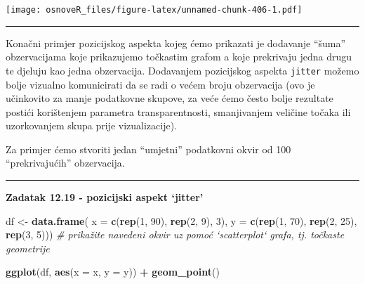 \documentclass[]{book}
\newenvironment{Shaded}{\begin{snugshade}}{\end{snugshade}}
\newcommand{\KeywordTok}[1]{\textcolor[rgb]{0.13,0.29,0.53}{\textbf{#1}}}
\newcommand{\DataTypeTok}[1]{\textcolor[rgb]{0.13,0.29,0.53}{#1}}
\newcommand{\DecValTok}[1]{\textcolor[rgb]{0.00,0.00,0.81}{#1}}
\newcommand{\StringTok}[1]{\textcolor[rgb]{0.31,0.60,0.02}{#1}}
\newcommand{\CommentTok}[1]{\textcolor[rgb]{0.56,0.35,0.01}{\textit{#1}}}
\newcommand{\OperatorTok}[1]{\textcolor[rgb]{0.81,0.36,0.00}{\textbf{#1}}}
\newcommand{\NormalTok}[1]{#1}
\theoremstyle{definition}
\theoremstyle{definition}
\theoremstyle{definition}
\theoremstyle{remark}
\begin{document}
\texttt{[image: osnoveR\_files/figure-latex/unnamed-chunk-406-1.pdf]}

\begin{center}\rule{0.5\linewidth}{\linethickness}\end{center}

Konačni primjer pozicijskog aspekta kojeg ćemo prikazati je dodavanje
``šuma'' obzervacijama koje prikazujemo točkastim grafom a koje
prekrivaju jedna drugu te djeluju kao jedna obzervacija. Dodavanjem
pozicijskog aspekta \texttt{jitter} možemo bolje vizualno komunicirati
da se radi o većem broju obzervacija (ovo je učinkovito za manje
podatkovne skupove, za veće ćemo često bolje rezultate postići
korištenjem parametra transparentnosti, smanjivanjem veličine točaka ili
uzorkovanjem skupa prije vizualizacije).

Za primjer ćemo stvoriti jedan ``umjetni'' podatkovni okvir od 100
``prekrivajućih'' obzervacija.

\begin{center}\rule{0.5\linewidth}{\linethickness}\end{center}

\textbf{Zadatak 12.19 - pozicijski aspekt `jitter'}

\begin{Shaded}
\begin{Highlighting}[]
\NormalTok{df <-}\StringTok{ }\KeywordTok{data.frame}\NormalTok{( }\DataTypeTok{x =} \KeywordTok{c}\NormalTok{(}\KeywordTok{rep}\NormalTok{(}\DecValTok{1}\NormalTok{, }\DecValTok{90}\NormalTok{), }\KeywordTok{rep}\NormalTok{(}\DecValTok{2}\NormalTok{, }\DecValTok{9}\NormalTok{), }\DecValTok{3}\NormalTok{),}
                  \DataTypeTok{y =} \KeywordTok{c}\NormalTok{(}\KeywordTok{rep}\NormalTok{(}\DecValTok{1}\NormalTok{, }\DecValTok{70}\NormalTok{), }\KeywordTok{rep}\NormalTok{(}\DecValTok{2}\NormalTok{, }\DecValTok{25}\NormalTok{), }\KeywordTok{rep}\NormalTok{(}\DecValTok{3}\NormalTok{, }\DecValTok{5}\NormalTok{)))}
\CommentTok{# prikažite navedeni okvir uz pomoć `scatterplot` grafa, tj. točkaste geometrije}
\end{Highlighting}
\end{Shaded}

\begin{Shaded}
\begin{Highlighting}[]
\KeywordTok{ggplot}\NormalTok{(df, }\KeywordTok{aes}\NormalTok{(}\DataTypeTok{x =}\NormalTok{ x, }\DataTypeTok{y =}\NormalTok{ y)) }\OperatorTok{+}\StringTok{ }\KeywordTok{geom_point}\NormalTok{()}
\end{Highlighting}
\end{Shaded}
\end{document}
